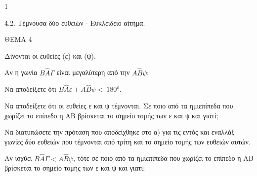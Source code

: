 \begin{ylh}{1}
    \item 4.2. Τέμνουσα δύο ευθειών - Ευκλείδειο αίτημα.
\end{ylh}

ΘΕΜΑ 4

Δίνονται οι ευθείες (ε) και (ψ).

\begin{alist}
\item Αν η γωνία $Β\widehat{Α}\Gamma$ είναι μεγαλύτερη από την $Α\widehat{Β}\psi$:

\begin{rlist}
\item Να αποδείξετε ότι $Β\widehat{Α}\varepsilon + Α\widehat{Β}\psi < \ 180^{ο}$. 

\item Να αποδείξετε ότι οι ευθείες ε και ψ τέμνονται. Σε ποιο από τα ημιεπίπεδα που χωρίζει το επίπεδο η ΑΒ βρίσκεται το σημείο τομής των ε και ψ και γιατί;


\end{rlist}
\item Να διατυπώσετε την πρόταση που αποδείχθηκε στο α) για τις εντός και εναλλάξ γωνίες δύο ευθειών που τέμνονται από τρίτη και το σημείο τομής των ευθειών αυτών.


\item Αν ισχύει $Β\widehat{Α}\Gamma < Α\widehat{Β}\psi$, τότε σε ποιο από τα ημιεπίπεδα που χωρίζει το επίπεδο η ΑΒ βρίσκεται το σημείο τομής των ε και ψ και γιατί; 


\end{alist}
